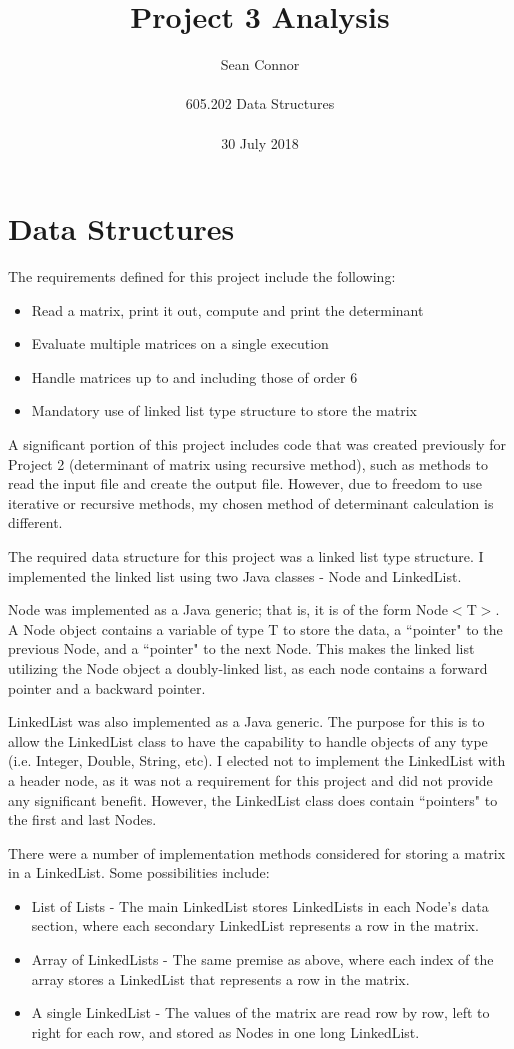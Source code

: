 \documentclass[12pt, titlepage]{article}
\title{Project 3 Analysis}
\author{Sean Connor \\ \\ 605.202 Data Structures \\ \\ 30 July 2018}
\date{}
\begin{document}
\maketitle




\section {Data Structures}

The requirements defined for this project include the following:
\begin{itemize}
	\item Read a matrix, print it out, compute and print the determinant
	\item Evaluate multiple matrices on a single execution
	\item Handle matrices up to and including those of order 6
	\item Mandatory use of linked list type structure to store the matrix
\end{itemize}

A significant portion of this project includes code that was created previously for Project 2 (determinant of matrix using recursive method), such as methods to read the input file and create the output file. However, due to freedom to use iterative or recursive methods, my chosen method of determinant calculation is different.
 
The required data structure for this project was a linked list type structure. I implemented the linked list using two Java classes - Node and LinkedList. 

Node was implemented as a Java generic; that is, it is of the form Node$<$T$>$. A Node object contains a variable of type T to store the data, a ``pointer" to the previous Node, and a ``pointer" to the next Node. This makes the linked list utilizing the Node object a doubly-linked list, as each node contains a forward pointer and a backward pointer.
 
LinkedList was also implemented as a Java generic. The purpose for this is to allow the LinkedList class to have the capability to handle objects of any type (i.e. Integer, Double, String, etc). I elected not to implement the LinkedList with a header node, as it was not a requirement for this project and did not provide any significant benefit. However, the LinkedList class does contain ``pointers" to the first and last Nodes. 

There were a number of implementation methods considered for storing a matrix in a LinkedList. Some possibilities include:
\begin{itemize}
	\item List of Lists - The main LinkedList stores LinkedLists in each Node's data section, where each secondary LinkedList represents a row in the matrix.
	\item Array of LinkedLists - The same premise as above, where each index of the array stores a LinkedList that represents a row in the matrix.
	\item A single LinkedList - The values of the matrix are read row by row, left to right for each row, and stored as Nodes in one long LinkedList.
\end{itemize}
\end{document}
